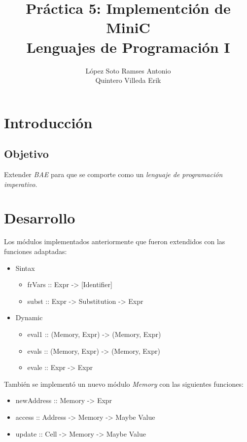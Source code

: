 \documentclass[12pt, letterpaper]{article}
\title{Práctica 5: Implementción de MiniC \\
       {\small Lenguajes de Programación I}}
\author{López Soto Ramses Antonio \\
        Quintero Villeda Erik}
\begin{document}
    \maketitle

    \section*{Introducción}

     \subsection*{Objetivo}
     Extender \textit{BAE} para que se comporte como un \textit{lenguaje de programación imperativo}.

    \section*{Desarrollo}
    Los módulos implementados anteriormente que fueron extendidos con las funciones adaptadas:

        \begin{itemize}
            \item Sintax
                  
                \begin{itemize}
                    \item frVars :: Expr -> [Identifier]
                    \item subst :: Expr -> Substitution -> Expr
                \end{itemize}

            \item Dynamic
            
                \begin{itemize}
                    \item eval1 :: (Memory, Expr) -> (Memory, Expr)
                    \item evals :: (Memory, Expr) -> (Memory, Expr)
                    \item evale :: Expr -> Expr
                \end{itemize}

        \end{itemize}

    También se implementó un nuevo módulo \textit{Memory} con las siguientes funciones:

        \begin{itemize}
            \item newAddress :: Memory -> Expr
            \item access :: Address -> Memory -> Maybe Value
            \item update :: Cell -> Memory -> Maybe Value
        \end{itemize}
\end{document}

